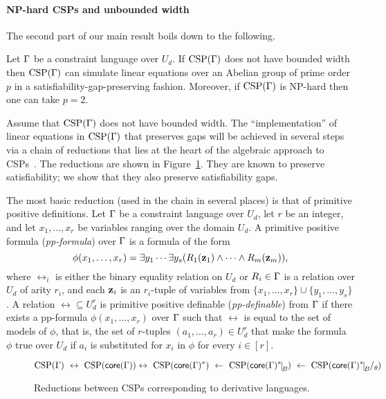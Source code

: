 \documentclass[11pt,letter]{article}
\begin{document}
\paragraph{NP-hard CSPs and unbounded width}

The second part of our main result boils down to the following.

\begin{theorem}\label{the:hsp-gap-o}
Let $\Gamma$ be a constraint language over $U_d$. 
If ${\rm CSP}(\Gamma)$ does not have bounded width then ${\rm CSP}(\Gamma)$ can simulate linear
  equations over an Abelian group of prime order $p$ in a
  satisfiability-gap-preserving fashion. Moreover, if ${\rm CSP}(\Gamma)$ is NP-hard
  then one can take $p=2$.
\end{theorem}


Assume that ${\rm CSP}(\Gamma)$ does not have bounded width. The ``implementation'' of
linear equations in ${\rm CSP}(\Gamma)$ that preserves gaps will be achieved
in several steps via a 
chain of reductions that lies at the heart of the algebraic approach to CSPs~\cite{Bulatov05:classifying}. 
The reductions are shown in Figure~\ref{fig:reductions-o}. They are
known to preserve satisfiability; we show that they also preserve satisfiability
gaps. 

The most basic reduction (used in the chain in several places) is that of
primitive positive definitions. 
Let $\Gamma$ be a constraint language over $U_d$, let $r$ be an integer, and
let $x_1,\ldots,x_r$ be variables ranging over the domain $U_d$. A primitive
positive formula (\emph{pp-formula}) over $\Gamma$ is a formula of the form
\begin{equation}\label{eq:pp-formula-o}
  \phi(x_1,\ldots,x_r)=\exists y_1\cdots\exists y_s(R_1({\bf z}_1)\wedge\cdots\wedge
  R_m({\bf z}_m)),
\end{equation}
where $\rel_i$ is either the binary equality relation on $U_d$ or $R_i\in\Gamma$ is a relation over $U_d$ of arity $r_i$, and each ${\bf z}_i$ is an $r_i$-tuple of variables from
$\{x_1,\ldots,x_r\}\cup\{y_1,\ldots,y_s\}$.
A relation $\rel\subseteq U_d^r$ is primitive positive definable
(\emph{pp-definable}) from $\Gamma$ if there
exists a pp-formula $\phi(x_1,\ldots,x_r)$ over $\Gamma$ such that $\rel$ is equal to the set of
models of $\phi$, that is, the set of $r$-tuples $(a_1,\ldots,a_r)\in U_d^r$
that make the formula $\phi$ true over $U_d$ if $a_i$ is
substituted for $x_i$ in $\phi$ for every $i\in [r]$.

\begin{figure}[t!]
\[
\CSP(\Gm)\ \leftrightarrow\ \CSP(\core(\Gm)) \leftrightarrow\ \CSP(\core(\Gm)^*)\ \leftarrow\ \CSP(\core(\Gm)^*\red B) \ \leftarrow\ \CSP(\core(\Gm)^*\red B\fac\th)
\]
\caption{Reductions between CSPs corresponding to derivative languages.}
\label{fig:reductions-o}
\end{figure}
\end{document}
